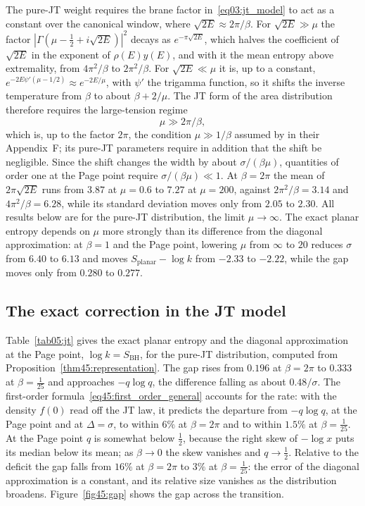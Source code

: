 \documentclass[11pt,letterpaper]{article}
\theoremstyle{plain}
\theoremstyle{definition}
\theoremstyle{remark}
\begin{document}
The pure-JT weight requires the brane factor in~\eqref{eq03:jt_model} to act as a constant over the canonical window, where $\sqrt{2E} \approx 2\pi/\beta$. For $\sqrt{2E} \gg \mu$ the factor $|\Gamma(\mu - \tfrac12 + i\sqrt{2E})|^2$ decays as $e^{-\pi\sqrt{2E}}$, which halves the coefficient of $\sqrt{2E}$ in the exponent of $\rho(E)y(E)$, and with it the mean entropy above extremality, from $4\pi^2/\beta$ to $2\pi^2/\beta$. For $\sqrt{2E} \ll \mu$ it is, up to a constant, $e^{-2E\psi'(\mu - 1/2)} \approx e^{-2E/\mu}$, with $\psi'$ the trigamma function, so it shifts the inverse temperature from $\beta$ to about $\beta + 2/\mu$. The JT form of the area distribution therefore requires the large-tension regime
\begin{equation}
\label{eq05:mu_condition}
\mu \gg 2\pi/\beta ,
\end{equation}
which is, up to the factor $2\pi$, the condition $\mu \gg 1/\beta$ assumed by \citet{pssyetal2022} in their Appendix~F; its pure-JT parameters require in addition that the shift be negligible. Since the shift changes the width by about $\sigma/(\beta\mu)$, quantities of order one at the Page point require $\sigma/(\beta\mu) \ll 1$. At $\beta = 2\pi$ the mean of $2\pi\sqrt{2E}$ runs from $3.87$ at $\mu = 0.6$ to $7.27$ at $\mu = 200$, against $2\pi^2/\beta = 3.14$ and $4\pi^2/\beta = 6.28$, while its standard deviation moves only from $2.05$ to $2.30$. All results below are for the pure-JT distribution, the limit $\mu \to \infty$. The exact planar entropy depends on $\mu$ more strongly than its difference from the diagonal approximation: at $\beta = 1$ and the Page point, lowering $\mu$ from $\infty$ to $20$ reduces $\sigma$ from $6.40$ to $6.13$ and moves $S_{\mathrm{planar}} - \log k$ from $-2.33$ to $-2.22$, while the gap moves only from $0.280$ to $0.277$.

\subsection{The exact correction in the JT model}
\label{subsec05:exact_page_curve}

Table~\ref{tab05:jt} gives the exact planar entropy and the diagonal approximation at the Page point, $\log k = S_{\mathrm{BH}}$, for the pure-JT distribution, computed from Proposition~\ref{thm45:representation}. The gap rises from $0.196$ at $\beta = 2\pi$ to $0.333$ at $\beta = \tfrac1{25}$ and approaches $-q\log q$, the difference falling as about $0.48/\sigma$. The first-order formula~\eqref{eq45:first_order_general} accounts for the rate: with the density $f(0)$ read off the JT law, it predicts the departure from $-q\log q$, at the Page point and at $\Delta = \sigma$, to within $6\%$ at $\beta = 2\pi$ and to within $1.5\%$ at $\beta = \tfrac1{25}$.
 At the Page point $q$ is somewhat below $\tfrac12$, because the right skew of $-\log x$ puts its median below its mean; as $\beta \to 0$ the skew vanishes and $q \to \tfrac12$. Relative to the deficit the gap falls from $16\%$ at $\beta = 2\pi$ to $3\%$ at $\beta = \tfrac1{25}$: the error of the diagonal approximation is a constant, and its relative size vanishes as the distribution broadens. Figure~\ref{fig45:gap} shows the gap across the transition.
\end{document}
